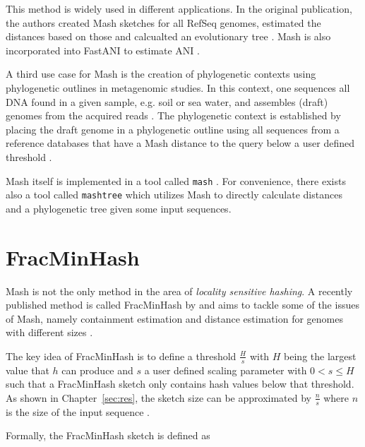 This method is widely used in different applications. In the original
publication, the authors created Mash sketches for all RefSeq genomes, estimated
the distances based on those and calcualted an evolutionary tree
\cite{ondovMashFastGenome2016}. Mash is also incorporated into FastANI to
estimate ANI \cite{jainHighThroughputANI2018}.

A third use case for Mash is the creation of phylogenetic contexts using
phylogenetic outlines \cite{bagciMicrobialPhylogeneticContext2021} in
metagenomic studies. In this context, one sequences all DNA found in a given
sample, e.g. soil or sea water, and assembles (draft) genomes from the acquired
reads \cite{kuninBioinformaticianGuideMetagenomics2008}. The phylogenetic
context is established by placing the draft genome in a phylogenetic outline
using all sequences from a reference databases that have a Mash distance to the
query below a user defined threshold
\cite{bagciMicrobialPhylogeneticContext2021}.

Mash itself is implemented in a tool called \texttt{mash}
\cite{ondovMashFastGenome2016}. For convenience, there exists also a tool called
\texttt{mashtree} \cite{katzMashtreeRapidComparison2019} which utilizes Mash to
directly calculate distances and a phylogenetic tree given some input sequences.

\section{FracMinHash}
Mash is not the only method in the area of \textit{locality sensitive hashing}.
A recently published method is called FracMinHash by
\cite{irberLightweightCompositionalAnalysis2022} and aims to tackle some of the
issues of Mash, namely containment estimation and distance estimation for
genomes with different sizes
\cite{heraDerivingConfidenceIntervals2023,koslickiImprovingMinHashContainment2019}.

The key idea of FracMinHash is to define a threshold $\frac{H}{s}$ with $H$
being the largest value that $h$ can produce and $s$ a user defined scaling
parameter with $0 < s \leq H$ such that a FracMinHash sketch only contains hash
values below that threshold. As shown in Chapter~\ref{sec:res}, the sketch size
can be approximated by $\frac{n}{s}$ where $n$ is the size of the input sequence
\cite{irberLightweightCompositionalAnalysis2022,heraDerivingConfidenceIntervals2023}.


Formally, the FracMinHash sketch is defined as 

